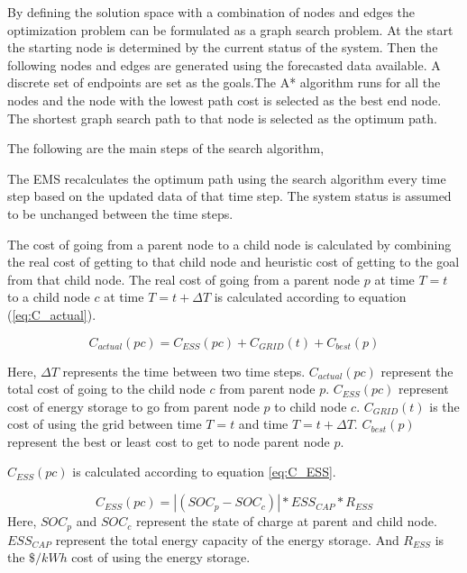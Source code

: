 By defining the solution space with a combination of nodes and edges the optimization problem can be formulated as a graph search problem. At the start the starting node is determined by the current status of the system. Then the following nodes and edges are generated using the forecasted data available. A discrete set of endpoints are set as the goals.The A*  algorithm runs for all the nodes and the node with the lowest path cost is selected as the best end node. The shortest graph search path to that node is selected as the optimum path.

The following are the main steps of the search algorithm,


The EMS recalculates the optimum path using the search algorithm every time step based on the updated data of that time step. The system status is assumed to be unchanged between the time steps.

The cost of going from a parent node to a child node is calculated by combining the real cost of getting to that child node and heuristic cost of getting to the goal from that child node. The real cost of going from a parent node $p$ at time $T=t$ to a child node $c$ at time $T=t+\Delta T$ is calculated according to equation (\ref{eq:C_actual}).

\begin{equation}
\label{eq:C_actual}
    C_{actual}(pc) =  C_{ESS}(pc)+C_{GRID}(t)+C_{best}(p)
\end{equation}

Here, $\Delta T$ represents the time between two time steps. $C_{actual}(pc)$ represent the total cost of going to the child node $c$ from parent node $p$. $C_{ESS}(pc)$ represent cost of energy storage to go from parent node $p$ to child node $c$. $C_{GRID}(t)$ is the cost of using the grid between time $T=t$ and time $T=t+\Delta T$. $C_{best}(p)$ represent the best or least cost to get to node parent node $p$.

$C_{ESS}(pc)$ is calculated according to equation \ref{eq:C_ESS}.

\begin{equation}
\label{eq:C_ESS}
C_{ESS}(pc) = |(SOC_p - SOC_c)|*ESS_{CAP}*R_{ESS} 
\end{equation}
Here, $SOC_p$ and $SOC_c$ represent the state of charge at parent and child node. $ESS_{CAP}$ represent the total energy capacity of the energy storage. And $R_{ESS}$ is the $\$/kWh$ cost of using the energy storage. 

